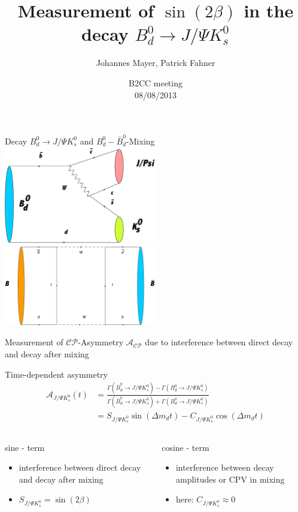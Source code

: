 \documentclass{beamer}
\title[Measurement of $\sin(2\beta)$]{Measurement of $\sin(2\beta)$ in the decay $B_d^0 \longrightarrow J/\Psi K_s^0$}
\subtitle[]{}
\author[Johannes Mayer, Patrick Fahner]{Johannes Mayer, Patrick Fahner}
\institute[]{LHCb, Physikalisches Institut \\ Heidelberg University}
\date[08/08/13]{B2CC meeting \\ 08/08/2013}
\begin{document}
\setlength\abovedisplayskip{0pt}
	\begin{frame}[plain]
	\titlepage
	\end{frame}
	
	\begin{frame}{Decay $B_d^0 \longrightarrow J/\Psi K_s^0$ and $B_d^0-\bar{B}_d^0$-Mixing}
	\includegraphics[width=0.5\textwidth]{Decay}
	\includegraphics[width=0.5\textwidth]{Mixing}
	\begin{center}
	\vspace{1.2cm}
	Measurement of $\mathcal{CP}$-Asymmetry $\mathcal{A_{CP}}$ due to interference between direct decay and decay after mixing
	\end{center}
	\end{frame}

	
	\begin{frame}{Time-dependent asymmetry}
	\begin{align}
	\mathcal{A}_{J/\Psi K_s^0}(t) &= \frac{\Gamma(\bar{B}_d^0 \rightarrow J/\Psi K_s^0)-\Gamma(B_d^0 \rightarrow J/\Psi K_s^0)}{\Gamma(\bar{B}_d^0 \rightarrow J/\Psi K_s^0)+\Gamma(B_d^0 \rightarrow J/\Psi K_s^0)} \\
		&= S_{J/\Psi K_s^0}\sin(\Delta m_d t) - C_{J/\Psi K_s^0}\cos(\Delta m_d t)
	\end{align}
	\begin{columns}
	\begin{block}{sine - term}
	\begin{itemize}
		\item interference between direct decay and decay after mixing
		\item $S_{J/\Psi K_s^0} = \sin(2\beta)$
	\end{itemize}
	\end{block}
	
	\begin{block}{cosine - term}
	\begin{itemize}
		\item interference between decay amplitudes or CPV in mixing
		\item here: $C_{J/\Psi K_s^0} \approx 0$
	\end{itemize}
	\end{block}
	\end{columns}
	\end{frame}
	
\end{document}
